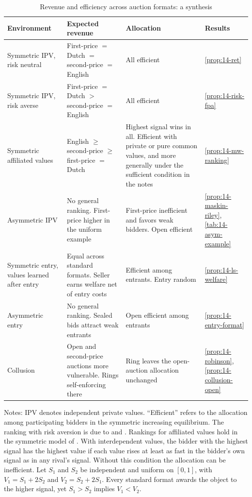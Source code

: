 \begin{table}[htbp]
\centering
\caption{Revenue and efficiency across auction formats: a synthesis}
\label{tab:14-ranking}
\footnotesize
\begin{tabularx}{\textwidth}{@{}>{\raggedright\arraybackslash}p{}>{\raggedright\arraybackslash}X>{\raggedright\arraybackslash}X>{\raggedright\arraybackslash}p{}@{}}
\toprule
Environment & Expected revenue & Allocation & Results \\
\midrule
Symmetric IPV, risk neutral & First-price $=$ Dutch $=$ second-price $=$ English & All efficient &
\cref{prop:14-ret} \\[3pt]
Symmetric IPV, risk averse & First-price $=$ Dutch $>$ second-price $=$ English & All efficient &
\cref{prop:14-risk-fpa} \\[3pt]
Symmetric affiliated values & English $\ge$ second-price $\ge$ first-price $=$ Dutch & Highest
signal wins in all. Efficient with private or pure common values, and more generally under the sufficient
condition in the notes & \cref{prop:14-mw-ranking} \\[3pt]
Asymmetric IPV & No general ranking. First-price higher in the uniform example & First-price
inefficient and favors weak bidders. Open efficient & \cref{prop:14-maskin-riley},
\cref{tab:14-asym-example} \\[3pt]
Symmetric entry, values learned after entry & Equal across standard formats. Seller earns welfare
net of entry costs & Efficient among entrants. Entry random & \cref{prop:14-ls-welfare} \\[3pt]
Asymmetric entry & No general ranking. Sealed bids attract weak entrants & Open efficient among
entrants & \cref{prop:14-entry-format} \\[3pt]
Collusion & Open and second-price auctions more vulnerable. Rings self-enforcing there & Ring leaves
the open-auction allocation unchanged & \cref{prop:14-robinson}, \cref{prop:14-collusion-open} \\
\bottomrule
\end{tabularx}
\par\smallskip
\parbox{\textwidth}{\footnotesize Notes: IPV denotes independent private values. ``Efficient'' refers
to the allocation among participating bidders in the symmetric increasing equilibrium. The ranking
with risk aversion is due to \citet{Holt1980} and \citet{MaskinRiley1984}. Rankings for affiliated
values hold in the symmetric model of \citet{MilgromWeber1982}. With interdependent values, the
bidder with the highest signal has the highest value if each value rises at least as fast in the
bidder's own signal as in any rival's signal. Without this condition the allocation can be
inefficient. Let $S_1$ and $S_2$ be independent and uniform on $[0,1]$, with $V_1=S_1+2S_2$ and
$V_2=S_2+2S_1$. Every standard format awards the object to the higher signal, yet $S_1>S_2$ implies
$V_1<V_2$.}
\end{table}

